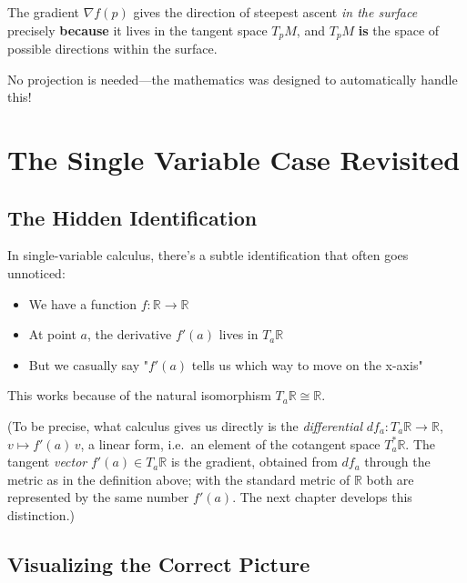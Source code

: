 \begin{notechapter}
The gradient $\nabla f(p)$ gives the direction of steepest ascent \emph{in the surface} precisely \textbf{because} it lives in the tangent space $T_p M$, and $T_p M$ \textbf{is} the space of possible directions within the surface.

No projection is needed—the mathematics was designed to automatically handle this!

\section{The Single Variable Case Revisited}

\subsection{The Hidden Identification}

In single-variable calculus, there's a subtle identification that often goes unnoticed:

\begin{itemize}
\item We have a function $f: \mathbb{R} \to \mathbb{R}$
\item At point $a$, the derivative $f'(a)$ lives in $T_a\mathbb{R}$
\item But we casually say "$f'(a)$ tells us which way to move on the x-axis"
\end{itemize}

This works because of the natural isomorphism $T_a\mathbb{R} \cong \mathbb{R}$.

(To be precise, what calculus gives us directly is the \emph{differential} $df_a: T_a\mathbb{R} \to \mathbb{R}$, $v \mapsto f'(a)\,v$, a linear form, i.e.\ an element of the cotangent space $T_a^*\mathbb{R}$. The tangent \emph{vector} $f'(a) \in T_a\mathbb{R}$ is the gradient, obtained from $df_a$ through the metric as in the definition above; with the standard metric of $\mathbb{R}$ both are represented by the same number $f'(a)$. The next chapter develops this distinction.)

\subsection{Visualizing the Correct Picture}

\begin{figure}[h]
\centering
{}
\end{figure}
\end{notechapter}
